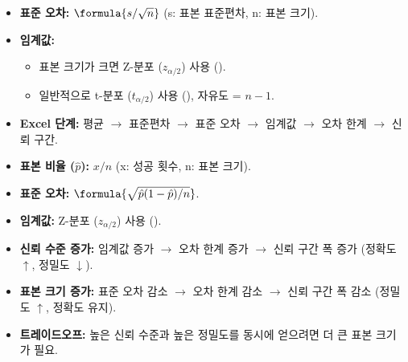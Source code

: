 \documentclass[11pt,a4paper]{article}
\begin{document}
\begin{tcolorbox}[colback=mygreen!10!white, colframe=mygreen!75!black, title=\textbf{모집단 평균에 대한 신뢰 구간}]
\begin{itemize}
    \item \textbf{표준 오차:} $\formula{s / \sqrt{n}}$ (s: 표본 표준편차, n: 표본 크기).
    \item \textbf{임계값:}
    \begin{itemize}
        \item 표본 크기가 크면 Z-분포 ($z_{\alpha/2}$) 사용 ().
        \item 일반적으로 t-분포 ($t_{\alpha/2}$) 사용 (), 자유도 = $n-1$.
    \end{itemize}
    \item \textbf{Excel 단계:} 평균 $\rightarrow$ 표준편차 $\rightarrow$ 표준 오차 $\rightarrow$ 임계값 $\rightarrow$ 오차 한계 $\rightarrow$ 신뢰 구간.
\end{itemize}
\end{tcolorbox}

\begin{tcolorbox}[colback=myred!10!white, colframe=myred!75!black, title=\textbf{모집단 비율에 대한 신뢰 구간}]
\begin{itemize}
    \item \textbf{표본 비율 ($\hat{p}$):} $x/n$ (x: 성공 횟수, n: 표본 크기).
    \item \textbf{표준 오차:} $\formula{\sqrt{\hat{p}(1-\hat{p})/n}}$.
    \item \textbf{임계값:} Z-분포 ($z_{\alpha/2}$) 사용 ().
\end{itemize}
\end{tcolorbox}

\begin{tcolorbox}[colback=myyellow!10!white, colframe=myyellow!75!black, title=\textbf{신뢰 수준 및 표본 크기의 영향}]
\begin{itemize}
    \item \textbf{신뢰 수준 증가:} 임계값 증가 $\rightarrow$ 오차 한계 증가 $\rightarrow$ 신뢰 구간 폭 증가 (정확도 $\uparrow$, 정밀도 $\downarrow$).
    \item \textbf{표본 크기 증가:} 표준 오차 감소 $\rightarrow$ 오차 한계 감소 $\rightarrow$ 신뢰 구간 폭 감소 (정밀도 $\uparrow$, 정확도 유지).
    \item \textbf{트레이드오프:} 높은 신뢰 수준과 높은 정밀도를 동시에 얻으려면 더 큰 표본 크기가 필요.
\end{itemize}
\end{tcolorbox}
\end{document}
